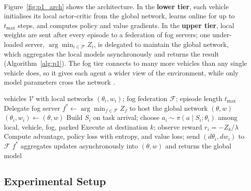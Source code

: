 \documentclass[12pt,a4paper,final]{extreport}
\begin{document}
\paragraph{} Figure~\ref{fig:p1_arch} shows the architecture. In the \textbf{lower tier}, each vehicle initialises its local actor-critic from the global network, learns online for up to $t_{\max}$ steps, and computes policy and value gradients. In the \textbf{upper tier}, local weights are sent after every episode to a federation of fog servers; one under-loaded server, $\arg\min_{i\in\mathcal{F}}Z_i$, is delegated to maintain the global network, which aggregates the local models asynchronously and returns the result (Algorithm~\ref{alg:p1}). The fog tier connects to many more vehicles than any single vehicle does, so it gives each agent a wider view of the environment, while only model parameters cross the network \cite{p1}.

\begin{algorithm}[htbp]
\caption{Two-tier federated A3C task offloading (summarised from \cite{p1})}\label{alg:p1}
\begin{algorithmic}[1]
\Require vehicles $\mathcal{V}$ with local networks $(\theta_i,w_i)$; fog federation $\mathcal{F}$; episode length $t_{\max}$
\State Delegate fog server $f^{*}\gets\arg\min_{f\in\mathcal{F}}Z_f$ to host the global network $(\theta,w)$
    \State $(\theta_i,w_i)\gets(\theta,w)$
      \State Build $S_i$ on task arrival; choose $a_i\sim\pi(a\mid S_i;\theta_i)$ among local, vehicle, fog, parked
      \State Execute at destination $k$; observe reward $r_i=-Z_k/\lambda$
    \EndFor
    \State Compute advantage, policy loss with entropy, and value loss; send $(d\theta_i,dw_i)$ to $\mathcal{F}$
  \EndFor
  \State $f^{*}$ aggregates updates asynchronously into $(\theta,w)$ and returns the global model
\EndFor
\end{algorithmic}
\end{algorithm}

\subsection{Experimental Setup}
\end{document}

